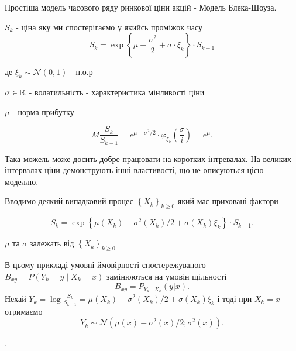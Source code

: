 \begin{example}
  Простіша модель часового ряду ринкової ціни акцій - Модель Блека-Шоуза.

  $S_k$ - ціна яку ми спостерігаємо у якийсь проміжок часу
\[ S_k = \exp\left\{\mu - \frac{\sigma^2}{2} + \sigma \cdot \xi_k \right\} \cdot S_{k-1} \]

де $\xi_k \sim \mathcal{N} (0,1)$ - н.о.р

$\sigma \in \mathbb{R}$ - волатильність - характеристика мінливості ціни

$\mu$ - норма прибутку

\[
  M \frac{S_k}{S_{k-1}} = e^{\mu - \sigma^2/2} \cdot \varphi_{\xi_{k}}\left( \frac{\sigma}{i} \right)
  = e ^{\mu}
.\] 

Така можель може досить добре працювати на коротких інтревалах.
На великих інтервалах ціни демонструють інші властивості, що не описуються цією моделлю.

Вводимо деякий випадковий процес $\left\{ X_k \right\}_{k \geq 0}$ який має приховані фактори

\[
S_k = \exp \left\{ \mu(X_k) - \sigma^2(X_k) / 2 + \sigma(X_k) \xi_k \right\} \cdot S_{k-1}
.\] 

$\mu$ та  $\sigma$ залежать від $\left\{ X_k \right\}_{k\geq 0}$

В цьому прикладі умовні ймовірності спостережуваного
$B_{xy} = P\left( Y_k = y  \mid X_k = x \right)$ замінюються на умовін щільності
\[
B_{xy} = P_{Y_k  \mid X_k}\left( y | x \right)
.\] 
Нехай $Y_k = \log \frac{S_k}{S_{k-1}} =
\mu(X_k) - \sigma^2(X_k) / 2 + \sigma(X_k) \xi_k$ і тоді при
$X_k = x$ отримаємо \[
  Y_k \sim \mathcal{N} \left( \mu(x) - \sigma^2(x) / 2; \sigma^2 (x) \right) 
.\] 

\end{example}
.

